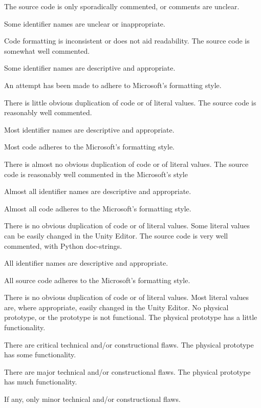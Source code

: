 \documentclass{../../fal_assignment}
\begin{document}
\begin{markingrubric}
	\grade The source code is only sporadically commented, or comments are unclear.
	\par Some identifier names are unclear or inappropriate.
	\par Code formatting is inconsistent or does not aid readability.
	\grade The source code is somewhat well commented.
	\par Some identifier names are descriptive and appropriate.
	\par An attempt has been made to adhere to Microsoft's formatting style.
	\par There is little obvious duplication of code or of literal values.           
	\grade The source code is reasonably well commented.
	\par Most identifier names are descriptive and appropriate.
	\par Most code adheres to the Microsoft's formatting style.
	\par There is almost no obvious duplication of code or of literal values.   
	\grade The source code is reasonably well commented in the Microsoft's style
	\par Almost all identifier names are descriptive and appropriate.
	\par Almost all code adheres to the Microsoft's formatting style.
	\par There is no obvious duplication of code or of literal values. Some literal values can be easily changed in the Unity Editor.
	\grade The source code is very well commented, with Python doc-strings.
	\par All identifier names are descriptive and appropriate.
	\par All source code adheres to the Microsoft's formatting style.
	\par There is no obvious duplication of code or of literal values. Most literal values are, where appropriate, easily changed in the Unity Editor.  
	\grade\fail No physical prototype, or the prototype is not functional.
	\grade The physical prototype has a little functionality.
	\par There are critical technical and/or constructional flaws.
	\grade The physical prototype has some functionality.
	\par There are major technical and/or constructional flaws.
	\grade The physical prototype has much functionality.
	\par If any, only minor technical and/or constructional flaws.

\end{markingrubric}
\end{document}
